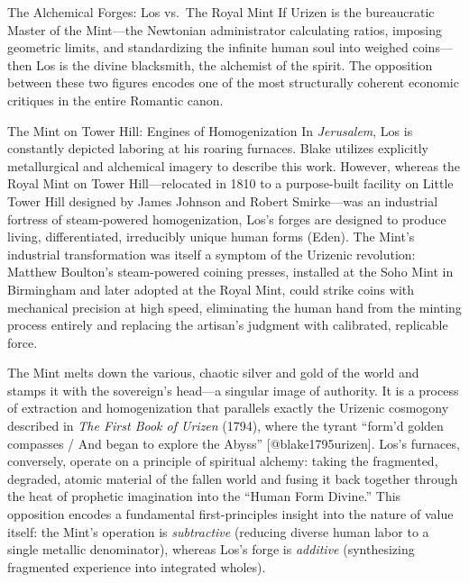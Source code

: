 \documentclass[
  ignorenonframetext,
]{beamer}
\author{\texorpdfstring{}{}}
\date{}
\begin{document}
\begin{frame}{The Alchemical Forges: Los vs.~The Royal Mint}
\protect{}\label{the-alchemical-forges-los-vs.-the-royal-mint}
If Urizen is the bureaucratic Master of the Mint---the Newtonian
administrator calculating ratios, imposing geometric limits, and
standardizing the infinite human soul into weighed coins---then Los is
the divine blacksmith, the alchemist of the spirit. The opposition
between these two figures encodes one of the most structurally coherent
economic critiques in the entire Romantic canon.

\begin{block}{The Mint on Tower Hill: Engines of Homogenization}
\protect{}\label{the-mint-on-tower-hill-engines-of-homogenization}
In \emph{Jerusalem}, Los is constantly depicted laboring at his roaring
furnaces. Blake utilizes explicitly metallurgical and alchemical imagery
to describe this work. However, whereas the Royal Mint on Tower
Hill---relocated in 1810 to a purpose-built facility on Little Tower
Hill designed by James Johnson and Robert Smirke---was an industrial
fortress of steam-powered homogenization, Los's forges are designed to
produce living, differentiated, irreducibly unique human forms (Eden).
The Mint's industrial transformation was itself a symptom of the
Urizenic revolution: Matthew Boulton's steam-powered coining presses,
installed at the Soho Mint in Birmingham and later adopted at the Royal
Mint, could strike coins with mechanical precision at high speed,
eliminating the human hand from the minting process entirely and
replacing the artisan's judgment with calibrated, replicable force.

The Mint melts down the various, chaotic silver and gold of the world
and stamps it with the sovereign's head---a singular image of authority.
It is a process of extraction and homogenization that parallels exactly
the Urizenic cosmogony described in \emph{The First Book of Urizen}
(1794), where the tyrant ``form'd golden compasses / And began to
explore the Abyss'' {[}@blake1795urizen{]}. Los's furnaces, conversely,
operate on a principle of spiritual alchemy: taking the fragmented,
degraded, atomic material of the fallen world and fusing it back
together through the heat of prophetic imagination into the ``Human Form
Divine.'' This opposition encodes a fundamental first-principles insight
into the nature of value itself: the Mint's operation is
\emph{subtractive} (reducing diverse human labor to a single metallic
denominator), whereas Los's forge is \emph{additive} (synthesizing
fragmented experience into integrated wholes).


\end{block}
\end{frame}
\end{document}
